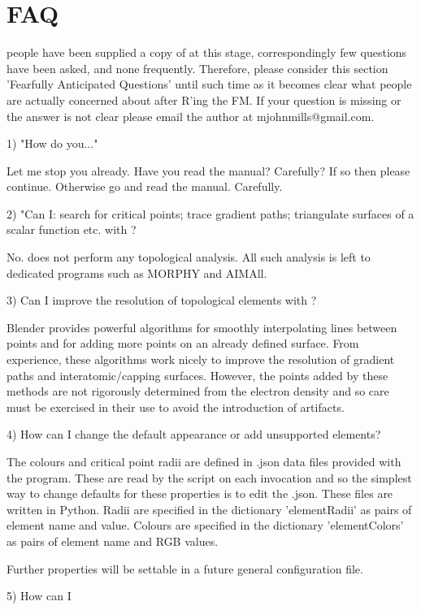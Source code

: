 \chapter{FAQ}

 people have been supplied a copy of \programName{} at this stage, correspondingly few questions have been asked, and none frequently. Therefore, please consider this section 'Fearfully Anticipated Questions' until such time as it becomes clear what people are actually concerned about after R'ing the FM. If your question is missing or the answer is not clear please email the author at mjohnmills@gmail.com.

1) "How do you..." 

Let me stop you already. Have you read the manual? Carefully? If so then please continue. Otherwise go and read the manual. Carefully.

2) "Can I: search for critical points; trace gradient paths; triangulate surfaces of a scalar function etc. with \programName{}?

No. \programName{} does not perform any topological analysis. All such analysis is left to dedicated programs such as MORPHY and AIMAll.

3) Can I improve the resolution of topological elements with \programName{}?

Blender provides powerful algorithms for smoothly interpolating lines between points and for adding more points on an already defined surface. From experience, these algorithms work nicely to improve the resolution of gradient paths and interatomic/capping surfaces. However, the points added by these methods are not rigorously determined from the electron density and so care must be exercised in their use to avoid the introduction of artifacts.

4) How can I change the default appearance or add unsupported elements?

The colours and critical point radii are defined in .json data files provided with the program. These are read by the script on each invocation and so the simplest way to change defaults for these properties is to edit the .json. These files are written in Python. Radii are specified in the dictionary 'elementRadii' as pairs of element name and value. Colours are specified in the dictionary 'elementColors' as pairs of element name and RGB values.

Further properties will be settable in a future general configuration file.

5) How can I 